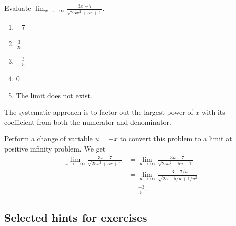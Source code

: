 \documentclass[../main.tex]{subfiles}
\begin{document}
\begin{exercise} \label{ex:infinity-root-negative}
  Evaluate \(\lim_{x \to -\infty} \frac{3x - 7}{\sqrt{25x^{2} + 5x + 1}}\).

  \begin{enumerate}[label=\Alph*.]
    \item \(-7\)
    \item \(\frac{3}{25}\)
    \item \(-\frac{3}{5}\)
    \item \(0\)
    \item The limit does not exist.
  \end{enumerate}

  \begin{hint}
    The systematic approach is to factor out the largest power of \(x\) with its coefficient from both the numerator and denominator.
  \end{hint}
  
  \begin{solution}
    Perform a change of variable \(u = -x\) to convert this problem to a limit at positive infinity problem. We get
    \begin{align*}
      \lim_{x \to -\infty} \frac{3x - 7}{\sqrt{25x^{2} + 5x + 1}} 
      &= \lim_{u \to \infty} \frac{-3u - 7}{\sqrt{25u^{2} - 5u + 1}}\\
      &= \lim_{u \to \infty} \frac{-3 - 7/u}{\sqrt{25 - 5/u + 1/u^{2}}}\\
      &= \frac{-3}{5}.
    \end{align*}
  \end{solution}
\end{exercise}

\subsection{Selected hints for exercises}
\printhints \label{page:midterm-prep-hints}
\clearpage


\end{document}
